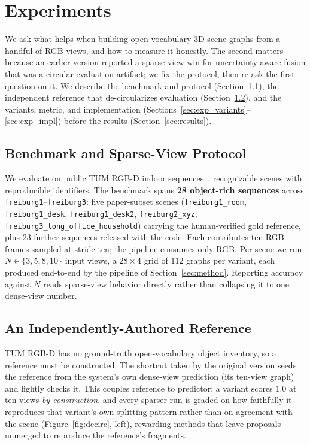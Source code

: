 \section{Experiments}
\label{sec:experiments}

We ask what helps when building open-vocabulary 3D scene graphs from a handful of RGB views, and how to measure it honestly. The second matters because an earlier version reported a sparse-view win for uncertainty-aware fusion that was a circular-evaluation artifact; we fix the protocol, then re-ask the first question on it. We describe the benchmark and protocol (Section~\ref{sec:exp_scenes}), the independent reference that de-circularizes evaluation (Section~\ref{sec:exp_reference}), and the variants, metric, and implementation (Sections~\ref{sec:exp_variants}--\ref{sec:exp_impl}) before the results (Section~\ref{sec:results}).

\subsection{Benchmark and Sparse-View Protocol}
\label{sec:exp_scenes}

We evaluate on public TUM RGB-D indoor sequences~\cite{sturm2012tumrgbd}, recognizable scenes with reproducible identifiers. The benchmark spans \textbf{28 object-rich sequences} across \texttt{freiburg1}--\texttt{freiburg3}: five paper-subset scenes (\texttt{freiburg1\_room}, \texttt{freiburg1\_desk}, \texttt{freiburg1\_desk2}, \texttt{freiburg2\_xyz}, \texttt{freiburg3\_long\_office\_household}) carrying the human-verified gold reference, plus 23 further sequences released with the code. Each contributes ten RGB frames sampled at stride ten; the pipeline consumes only RGB. Per scene we run $N\in\{3,5,8,10\}$ input views, a $28\times4$ grid of $112$ graphs per variant, each produced end-to-end by the pipeline of Section~\ref{sec:method}. Reporting accuracy against $N$ reads sparse-view behavior directly rather than collapsing it to one dense-view number.

\subsection{An Independently-Authored Reference}
\label{sec:exp_reference}



TUM RGB-D has no ground-truth open-vocabulary object inventory, so a reference must be constructed. The shortcut taken by the original version seeds the reference from the system's own dense-view prediction (its ten-view graph) and lightly checks it. This couples reference to predictor: a variant scores $1.0$ at ten views \emph{by construction}, and every sparser run is graded on how faithfully it reproduces that variant's own splitting pattern rather than on agreement with the scene (Figure~\ref{fig:decirc}, left), rewarding methods that leave proposals unmerged to reproduce the reference's fragments.

